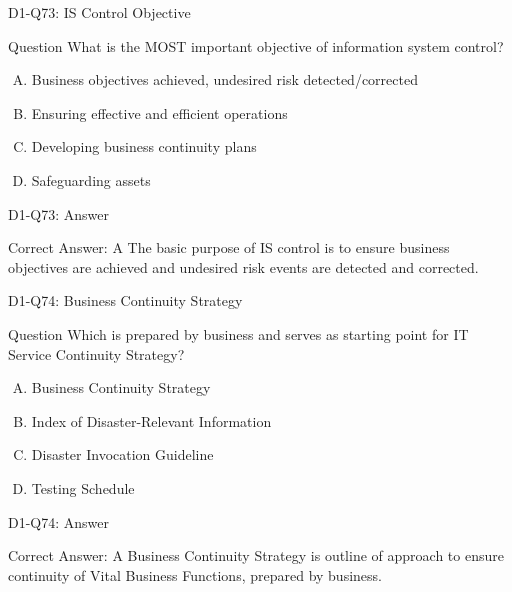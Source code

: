 \documentclass{beamer}
\begin{document}
	\begin{frame}{D1-Q73: IS Control Objective}
		\begin{block}{Question}
			What is the MOST important objective of information system control?
		\end{block}
		\begin{enumerate}[(A)]
			\item Business objectives achieved, undesired risk detected/corrected
			\item Ensuring effective and efficient operations
			\item Developing business continuity plans
			\item Safeguarding assets
		\end{enumerate}
	\end{frame}
	\begin{frame}{D1-Q73: Answer}
		\begin{block}{Correct Answer: A}
			The basic purpose of IS control is to ensure business objectives are achieved and undesired risk events are detected and corrected.
		\end{block}
	\end{frame}
	
	\begin{frame}{D1-Q74: Business Continuity Strategy}
		\begin{block}{Question}
			Which is prepared by business and serves as starting point for IT Service Continuity Strategy?
		\end{block}
		\begin{enumerate}[(A)]
			\item Business Continuity Strategy
			\item Index of Disaster-Relevant Information
			\item Disaster Invocation Guideline
			\item Testing Schedule
		\end{enumerate}
	\end{frame}
	\begin{frame}{D1-Q74: Answer}
		\begin{block}{Correct Answer: A}
			Business Continuity Strategy is outline of approach to ensure continuity of Vital Business Functions, prepared by business.
		\end{block}
	\end{frame}
	
\end{document}
